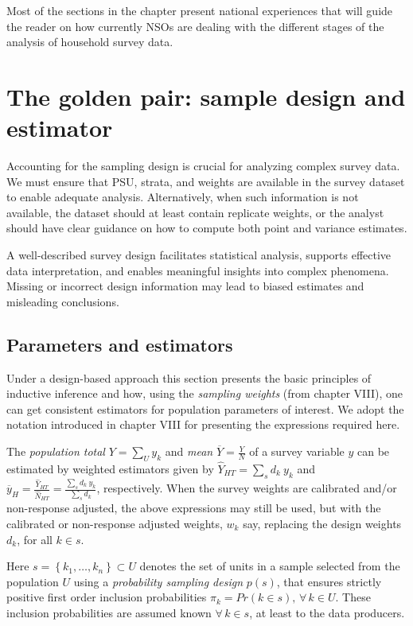 \documentclass[
  12pt,
]{book}
\begin{document}
Most of the sections in the chapter present national experiences that will guide the reader on how currently NSOs are dealing with the different stages of the analysis of household survey data.

\chapter{The golden pair: sample design and estimator}\label{the-golden-pair-sample-design-and-estimator}

Accounting for the sampling design is crucial for analyzing complex survey data. We must ensure that PSU, strata, and weights are available in the survey dataset to enable adequate analysis. Alternatively, when such information is not available, the dataset should at least contain replicate weights, or the analyst should have clear guidance on how to compute both point and variance estimates.

A well-described survey design facilitates statistical analysis, supports effective data interpretation, and enables meaningful insights into complex phenomena. Missing or incorrect design information may lead to biased estimates and misleading conclusions.

\section{Parameters and estimators}\label{parameters-and-estimators}

Under a design-based approach this section presents the basic principles of inductive inference and how, using the \emph{sampling weights} (from chapter VIII), one can get consistent estimators for population parameters of interest. We adopt the notation introduced in chapter VIII for presenting the expressions required here.

The \emph{population total} \(Y = \sum _{U} y_k\) and \emph{mean} \(\overline Y = \frac Y N\) of a survey variable \(y\) can be estimated by weighted estimators given by \(\widehat Y _{HT} = \sum _{s} d_k \ y_k\) and \(\overline y_{H} = \frac {\widehat Y_{HT}} {\widehat N_{HT}} = \frac {\sum_{s} d_k \ y_k} {\sum_{s} d_k}\), respectively. When the survey weights are calibrated and/or non-response adjusted, the above expressions may still be used, but with the calibrated or non-response adjusted weights, \(w_k\) say, replacing the design weights \(d_k\), for all \(k \in s\).

Here \(s = \left\{ k_1, \ldots, k_n \right\} \subset U\) denotes the set of units in a sample selected from the population \(U\) using a \emph{probability sampling design} \(p(s)\), that ensures strictly positive first order inclusion probabilities \(\pi_k = Pr(k \in s), \, \forall \, k \in U\). These inclusion probabilities are assumed known \(\forall \, k \in s\), at least to the data producers.
\end{document}

